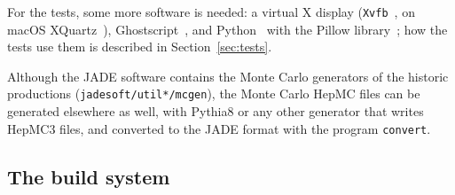 For the tests, some more software is needed: a virtual X display (\texttt{Xvfb}~\cite{Xvfb:web}, on macOS XQuartz~\cite{XQuartz:web}), Ghostscript~\cite{Ghostscript:web}, and Python~\cite{Python:web}
with the Pillow library~\cite{Pillow:web}; how the tests use them is described in Section~\ref{sec:tests}.

Although the JADE software contains the Monte Carlo generators of the historic productions (\texttt{jadesoft/\allowbreak{}util*/\allowbreak{}mcgen}),
the Monte Carlo HepMC files can be generated elsewhere as well, with Pythia8 or any other generator that writes
HepMC3 files, and converted to the JADE format with the program \texttt{convert}.


\subsection{The build system}
\label{sec:build}

